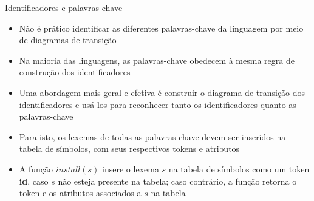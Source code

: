 \begin{frame}[fragile]{Identificadores e palavras-chave}

    \begin{itemize}
        \item Não é prático identificar as diferentes palavras-chave da linguagem por meio de diagramas de transição

        \item Na maioria das linguagens, as palavras-chave obedecem à mesma regra de construção dos identificadores

        \item Uma abordagem mais geral e efetiva é construir o diagrama de transição dos identificadores e usá-los para reconhecer tanto os identificadores
            quanto as palavras-chave

        \item Para isto, os lexemas de todas as palavras-chave devem ser inseridos na tabela de símbolos, com seus respectivos tokens e atributos

        \item A função $install(s)$ insere o lexema $s$ na tabela de símbolos como um token \textbf{id}, caso $s$ não esteja presente na tabela; caso
            contrário, a função retorna o token e os atributos associados a $s$ na tabela
    \end{itemize}

\end{frame}

